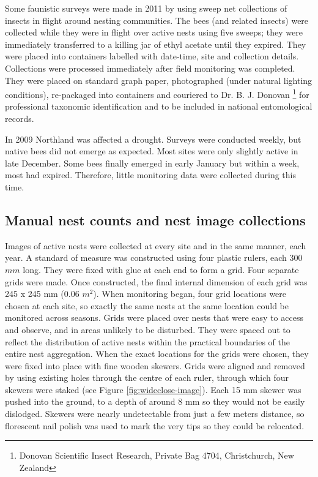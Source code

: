 Some faunistic surveys were made in 2011 by using sweep net collections of insects in flight around nesting communities. The bees (and related insects) were collected while they were in flight over active nests using five sweeps; they were immediately transferred to a killing jar of ethyl acetate until they expired. They were placed into containers labelled with date-time, site and collection details. Collections were processed immediately after field monitoring was completed. They were placed on standard graph paper, photographed (under natural lighting conditions), re-packaged into containers and couriered to Dr. B. J. Donovan \footnote{Donovan Scientific Insect Research, Private Bag 4704, Christchurch, New Zealand} for professional taxonomic identification and to be included in national entomological records.

In 2009 Northland was affected a drought. Surveys were conducted weekly, but native bees did not emerge as expected. Most sites were only slightly active in late December. Some bees finally emerged in early January but within a week, most had expired. Therefore, little monitoring data were collected during this time.

\subsection{Manual nest counts and nest image collections}
Images of active nests were collected at every site and in the same manner, each year. A standard of measure was constructed using four plastic rulers, each 300 $mm$ long. They were fixed with glue at each end to form a grid. Four separate grids were made. Once constructed, the final internal dimension of each grid was 245 x 245 mm (0.06 $m^2$). When monitoring began, four grid locations were chosen at each site, so exactly the same nests at the same location could be monitored across seasons. Grids were placed over nests that were easy to access and observe, and in areas unlikely to be disturbed. They were spaced out to reflect the distribution of active nests within the practical boundaries of the entire nest aggregation. When the exact locations for the grids were chosen, they were fixed into place with fine wooden skewers. Grids were aligned and removed by using existing holes through the centre of each ruler, through which four skewers were staked (see Figure \ref{fig:wideclose-image}). Each 15 mm skewer was pushed into the ground, to a depth of around 8 mm so they would not be easily dislodged. Skewers were nearly undetectable from just a few meters distance, so florescent nail polish was used to mark the very tips so they could be relocated. 

